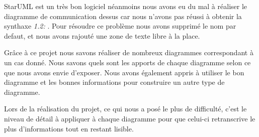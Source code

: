 \documentclass[11pt,a4paper]{article}
\begin{document}
StarUML est un très bon logiciel néanmoins nous avons eu du
mal à réaliser le diagramme de communication dessus car nous
n'avons pas réussi à obtenir la synthaxe \textit{1.2:} . Pour
résoudre ce problème nous avons supprimé le nom par defaut, et
nous avons rajouté une zone de texte libre à la place.

Grâce à ce projet nous savons réaliser de nombreux diagrammes
correspondant à un cas donné. Nous savons quels sont les apports
de chaque diagramme selon ce que nous avons envie d'exposer.
Nous avons également appris à utiliser le bon diagramme et
les bonnes informations pour construire un autre type de 
diagramme.

Lors de la réalisation du projet, ce qui nous a posé le plus de
difficulté, c'est le niveau de détail à appliquer à chaque
diagramme pour que celui-ci retranscrive le plus d'informations
tout en restant lisible.
\end{document}
